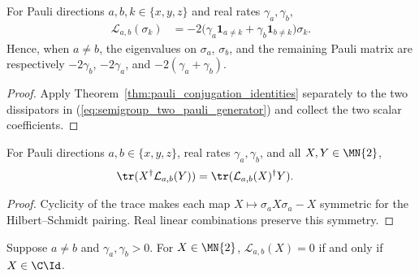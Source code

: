 \begin{theorem}
    \label{thm:two_pauli_generator_spectrum}
    \leanok
    For Pauli directions $a,b,k\in\{x,y,z\}$ and real rates
    $\gamma_a,\gamma_b$,
    \begin{align}
        \mathcal L_{a,b}(\sigma_k)
        &=-2\bigl(\gamma_a\mathbf 1_{a\ne k}
                  +\gamma_b\mathbf 1_{b\ne k}\bigr)\sigma_k.
        \label{eq:semigroup_two_pauli_spectrum}
    \end{align}
    Hence, when $a\ne b$, the eigenvalues on $\sigma_a$, $\sigma_b$, and the
    remaining Pauli matrix are respectively
    $-2\gamma_b$, $-2\gamma_a$, and $-2(\gamma_a+\gamma_b)$.
\end{theorem}

\begin{proof}
    \leanok
    Apply Theorem~\ref{thm:pauli_conjugation_identities} separately to the two
    dissipators in (\ref{eq:semigroup_two_pauli_generator}) and collect the two
    scalar coefficients.
\end{proof}

\begin{theorem}
    \label{thm:two_pauli_generator_trace_symmetry}
    \leanok
    For Pauli directions $a,b\in\{x,y,z\}$, real rates
    $\gamma_a,\gamma_b$, and all $X,Y\in\MN{2}$,
    \begin{align}
        \tr(X^\dagger\mathcal L_{a,b}(Y))
        &=\tr(\mathcal L_{a,b}(X)^\dagger Y).
        \notag
    \end{align}
\end{theorem}

\begin{proof}
    \leanok
    Cyclicity of the trace makes each map
    $X\mapsto\sigma_aX\sigma_a-X$ symmetric for the Hilbert--Schmidt pairing.
    Real linear combinations preserve this symmetry.
\end{proof}

\begin{theorem}
    \label{thm:two_pauli_generator_scalar_kernel}
    \leanok
    Suppose $a\ne b$ and $\gamma_a,\gamma_b>0$. For $X\in\MN{2}$,
    $\mathcal L_{a,b}(X)=0$ if and only if $X\in\C\Id$.
\end{theorem}

